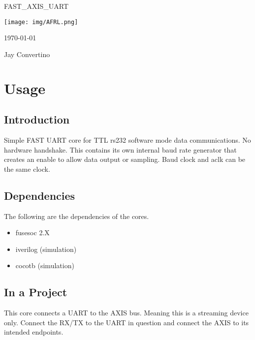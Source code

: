 \begin{titlepage}
  \begin{center}

  {\Huge FAST\_AXIS\_UART}

  \vspace{25mm}

  \texttt{[image: img/AFRL.png]}

  \vspace{25mm}

  \today

  \vspace{15mm}

  {\Large Jay Convertino}

  \end{center}
\end{titlepage}

\tableofcontents

\newpage

\section{Usage}

\subsection{Introduction}

\par
Simple FAST UART core for TTL rs232 software mode data communications. No hardware handshake.
This contains its own internal baud rate generator that creates an enable to allow data output
or sampling. Baud clock and aclk can be the same clock.

\subsection{Dependencies}

\par
The following are the dependencies of the cores.

\begin{itemize}
  \item fusesoc 2.X
  \item iverilog (simulation)
  \item cocotb (simulation)
\end{itemize}



\subsection{In a Project}
\par
This core connects a UART to the AXIS bus. Meaning this is a streaming device only. Connect the RX/TX to the UART in question and connect the AXIS to its intended endpoints.

